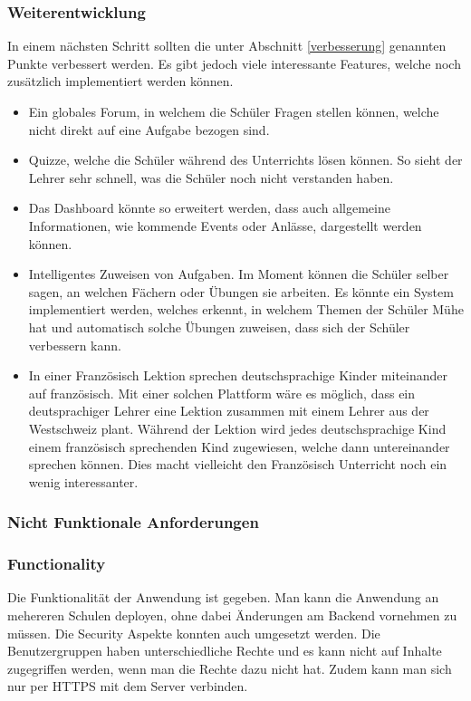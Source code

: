 \subsubsection{Weiterentwicklung}
In einem nächsten Schritt sollten die unter Abschnitt \ref{verbesserung} genannten Punkte verbessert werden. Es gibt jedoch viele interessante Features, welche noch zusätzlich implementiert werden können.

\begin{itemize}
	\item Ein globales Forum, in welchem die Schüler Fragen stellen können, welche nicht direkt auf eine Aufgabe bezogen sind.
	\item Quizze, welche die Schüler während des Unterrichts lösen können. So sieht der Lehrer sehr schnell, was die Schüler noch nicht verstanden haben.
	\item Das Dashboard könnte so erweitert werden, dass auch allgemeine Informationen, wie kommende Events oder Anlässe, dargestellt werden können.
	\item Intelligentes Zuweisen von Aufgaben. Im Moment können die Schüler selber sagen, an welchen Fächern oder Übungen sie arbeiten. Es könnte ein System implementiert werden, welches erkennt, in welchem Themen der Schüler Mühe hat und automatisch solche Übungen zuweisen, dass sich der Schüler verbessern kann.
	\item In einer Französisch Lektion sprechen deutschsprachige Kinder miteinander auf französisch.	Mit einer solchen Plattform wäre es möglich, dass ein deutsprachiger Lehrer eine Lektion zusammen mit einem Lehrer aus der Westschweiz plant. Während der Lektion wird jedes deutschsprachige Kind einem französisch sprechenden Kind zugewiesen, welche dann untereinander sprechen können. Dies macht vielleicht den Französisch Unterricht noch ein wenig interessanter.
\end{itemize}


\subsubsection{Nicht Funktionale Anforderungen}

\subsubsection*{Functionality}
Die Funktionalität der Anwendung ist gegeben. Man kann die Anwendung an mehereren Schulen deployen, ohne dabei Änderungen am Backend vornehmen zu müssen. Die Security Aspekte konnten auch umgesetzt werden. Die Benutzergruppen haben unterschiedliche Rechte und es kann nicht auf Inhalte zugegriffen werden, wenn man die Rechte dazu nicht hat. Zudem kann man sich nur per HTTPS mit dem Server verbinden.

